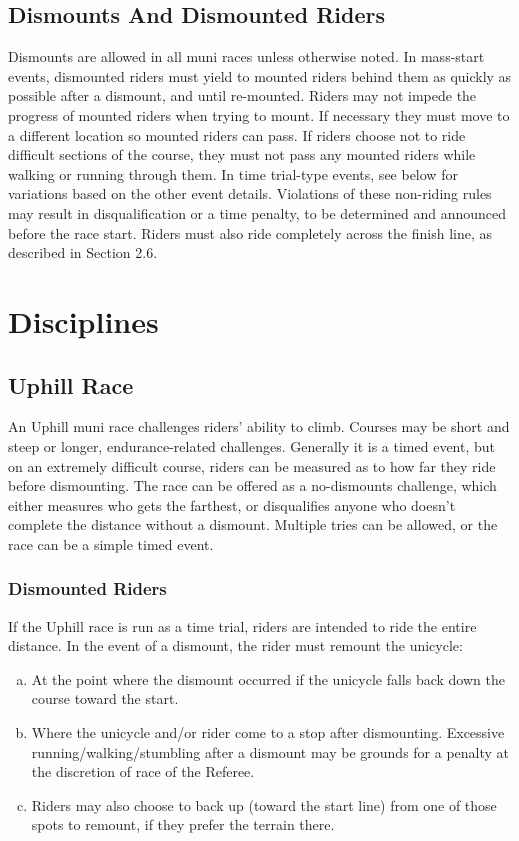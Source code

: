 \subsection{Dismounts And Dismounted Riders}
\label{sec:muni-dismounts}
Dismounts are allowed in all muni races unless otherwise noted. In mass-start
events, dismounted riders must yield to mounted riders behind them as quickly as
possible after a dismount, and until re-mounted. Riders may not impede the
progress of mounted riders when trying to mount. If necessary they must move to
a different location so mounted riders can pass. If riders choose not to ride
difficult sections of the course, they must not pass any mounted riders while
walking or running through them. In time trial-type events, see below for
variations based on the other event details. Violations of these non-riding
rules may result in disqualification or a time penalty, to be determined and
announced before the race start. Riders must also ride completely across the
finish line, as described in Section 2.6. %


\section{Disciplines}
\label{sec:muni-disciplines}

\subsection{Uphill Race}
\label{sec:muni-uphill}
An Uphill muni race challenges riders' ability to climb. Courses may be short
and steep or longer, endurance-related challenges. Generally it is a timed
event, but on an extremely difficult course, riders can be measured as to how
far they ride before dismounting. The race can be offered as a no-dismounts
challenge, which either measures who gets the farthest, or disqualifies anyone
who doesn't complete the distance without a dismount. Multiple tries can be
allowed, or the race can be a simple timed event.

\subsubsection{Dismounted Riders}
If the Uphill race is run as a time trial, riders are intended to ride the
entire distance. In the event of a dismount, the rider must remount the
unicycle:

\begin{enumerate}[(a)]
\item At the point where the dismount occurred if the unicycle falls back down
      the course toward the start. 
\item Where the unicycle and/or rider come to a stop after dismounting.
      Excessive running/walking/stumbling after a dismount may be grounds for a
      penalty at the discretion of race of the Referee. 
\item Riders may also choose to back up (toward the start line) from one of
      those spots to remount, if they prefer the terrain there.
\end{enumerate}


